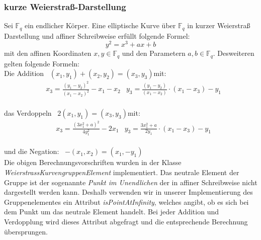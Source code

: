 \documentclass{scrartcl}
\begin{document}
\subsubsection{kurze Weierstraß-Darstellung}
\label{sec:weierstrass_kurven}
Sei $\mathbb{F}_q$ ein endlicher Körper.
Eine elliptische Kurve über $\mathbb{F}_q$ in kurzer Weierstraß Darstellung und affiner Schreibweise erfüllt folgende Formel:
$$ y^2 = x^3 + ax +b$$
mit den affinen Koordinaten $x,y \in \mathbb{F}_q$ und den Parametern $a, b \in \mathbb{F}_q$.
Desweiteren gelten folgende Formeln: \vspace{5pt}\\
Die Addition \ $(x_1,y_1)+(x_2,y_2)=(x_3,y_3)$\quad mit: \\
\begin{align*}
  &x_3=\frac{(y_1-y_2)^2}{(x_1-x_2)^2}-x_1-x_2
  &y_3=\frac{(y_1-y_2)}{(x_1-x_2)}\cdot (x_1 - x_3) - y_1
\end{align*}\\
das Verdoppeln \ $ 2(x_1,y_1)=(x_3,y_3) $\quad mit: \\
\begin{align*} 
  &x_3=\frac{(3x_1^2+a)^2}{4y_1^2}-2x_1
  &y_3= \frac{3x_1^2+a}{2y_1} \cdot (x_1 - x_3) - y_1
\end{align*}\\
und die Negation: \ $-(x_1,x_2)=(x_1,-y_1) $ \vspace{5pt} \\
Die obigen Berechnungsvorschriften wurden in der Klasse \emph{WeierstrassKurvengruppenElement} implementiert. Das neutrale Element der Gruppe ist der sogenannte \emph{Punkt im Unendlichen} der in affiner Schreibweise nicht dargestellt werden kann. Deshalb verwenden wir in unserer Implementierung des Gruppenelementes ein Attribut {\emph{isPointAtInfinity}}, welches angibt, ob es sich bei dem Punkt um das neutrale Element handelt. Bei jeder Addition und Verdopplung wird dieses Attribut abgefragt und die entsprechende Berechnung übersprungen.
\end{document}
